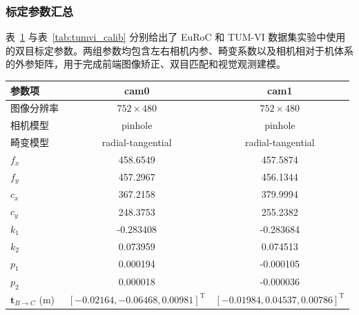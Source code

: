 \subsubsection{标定参数汇总}

表~\ref{tab:euroc_calib} 与表~\ref{tab:tumvi_calib} 分别给出了 EuRoC 和 TUM-VI 数据集实验中使用的双目标定参数。两组参数均包含左右相机内参、畸变系数以及相机相对于机体系的外参矩阵，用于完成前端图像矫正、双目匹配和视觉观测建模。

\begin{table}[!t]
\centering
{}
\label{tab:euroc_calib}
\scriptsize
\begin{tabular}{lcc}
\toprule
参数项 & cam0 & cam1 \\
\midrule
图像分辨率 & $752 \times 480$ & $752 \times 480$ \\
相机模型 & pinhole & pinhole \\
畸变模型 & radial-tangential & radial-tangential \\
$f_x$ & 458.6549 & 457.5874 \\
$f_y$ & 457.2967 & 456.1344 \\
$c_x$ & 367.2158 & 379.9994 \\
$c_y$ & 248.3753 & 255.2382 \\
$k_1$ & -0.283408 & -0.283684 \\
$k_2$ & 0.073959 & 0.074513 \\
$p_1$ & 0.000194 & -0.000105 \\
$p_2$ & 0.000018 & -0.000036 \\
$\mathbf{t}_{B\rightarrow C}$ (m) & $[-0.02164, -0.06468, 0.00981]^\mathrm{T}$ & $[-0.01984, 0.04537, 0.00786]^\mathrm{T}$ \\
\bottomrule
\end{tabular}
\end{table}


